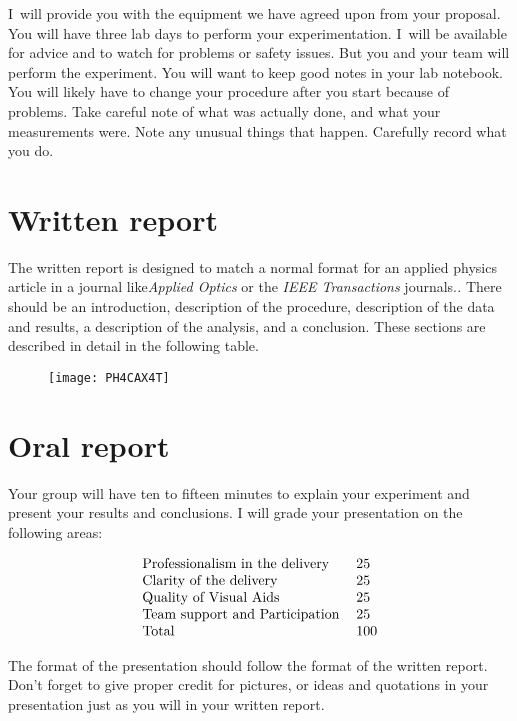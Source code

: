 I\ will provide you with the equipment we have agreed upon from your
proposal. You will have three lab days to perform your experimentation. I\
will be available for advice and to watch for problems or safety issues. But
you and your team will perform the experiment. You will want to keep good
notes in your lab notebook. You will likely have to change your procedure
after you start because of problems. Take careful note of what was actually
done, and what your measurements were. Note any unusual things that happen.
Carefully record what you do.

\section{Written report}

The written report is designed to match a normal format for an applied
physics article in a journal like\emph{Applied Optics} or the \emph{IEEE
Transactions} journals.\emph{.} There should be an introduction, description
of the procedure, description of the data and results, a description of the
analysis, and a conclusion. These sections are described in detail in the
following table.

\begin{figure}[h!]
\texttt{[image: PH4CAX4T]}
\end{figure}

\section{Oral report}

Your group will have ten to fifteen minutes to explain your experiment and
present your results and conclusions. I will grade your presentation on the
following areas:

\begin{equation*}
\begin{tabular}{ll}
Professionalism in the delivery & 25 \\ 
Clarity of the delivery & 25 \\ 
Quality of Visual Aids & 25 \\ 
Team support and Participation & 25 \\ 
Total & 100%
\end{tabular}%
\end{equation*}

The format of the presentation should follow the format of the written
report. Don't forget to give proper credit for pictures, or ideas and
quotations in your presentation just as you will in your written report.

